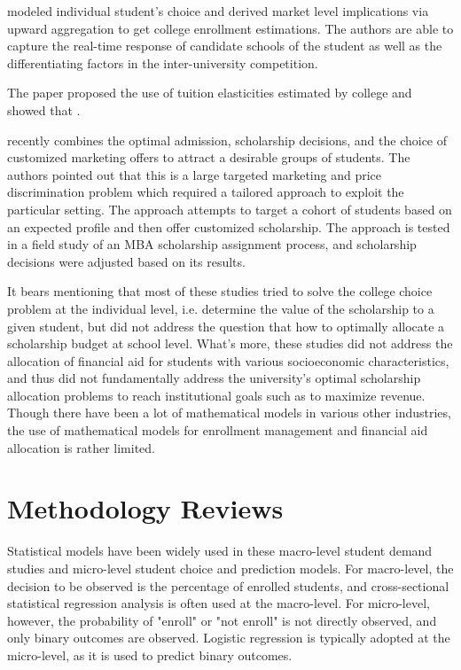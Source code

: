 \documentclass[12pt,english]{report}
\begin{document}
\citet{Carter2011} modeled individual student's choice and derived market level implications 
via upward aggregation to get college enrollment estimations. The authors are able to capture 
the real-time response of candidate schools of the student as well as the differentiating 
factors in the inter-university competition.

The paper proposed the use of tuition elasticities estimated by college and showed that 
.

\citet{Belloni2012} recently combines the optimal admission, scholarship decisions, and the 
choice of customized marketing offers to attract a desirable groups of students.  The authors 
pointed out that this is a large targeted marketing and price discrimination problem which 
required a tailored approach to exploit the particular setting.  The approach attempts to 
target a cohort of students based on an expected profile and then offer customized 
scholarship. The approach is tested in a field study of  an MBA scholarship assignment process, 
and scholarship decisions were adjusted based on its results.

It bears mentioning that most of these studies tried to solve the college choice problem at the individual level, i.e. determine the value of the scholarship  to a given student, but did not address the question that how to optimally allocate a scholarship budget at school level. What's more, these studies did not address the allocation of financial aid for students with various socioeconomic characteristics, and thus did not fundamentally address the university's optimal scholarship allocation problems to reach institutional goals such as to maximize revenue.  Though there have been a lot of mathematical models in various other industries, the use of mathematical models for enrollment management and financial aid allocation is rather limited.

\section{Methodology Reviews}
Statistical models have been widely used in these macro-level student 
demand studies and micro-level student choice and prediction models. 
For macro-level, the decision to be observed is the percentage of 
enrolled students, and cross-sectional statistical regression 
analysis is often used at the macro-level. For micro-level, however, 
the probability of "enroll" or "not enroll" is not directly 
observed, and only binary outcomes are observed. Logistic regression 
is typically adopted at the micro-level, as it is used to predict 
binary outcomes.
\end{document}

